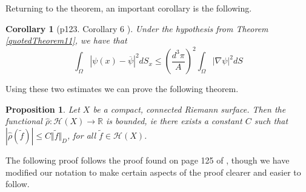 \documentclass[11pt]{report}
\newtheorem{prop}[thm]{Proposition}
\newtheorem{cor}[thm]{Corollary}
\theoremstyle{definition}
\begin{document}
Returning to the theorem, an important corollary is the following.
\begin{cor}[p123. Corollary 6 \cite{donaldson}]\label{quotedCorollary6}
  Under the hypothesis from Theorem \ref{quotedTheorem11}, we have that 
  \[\int_\Omega |\psi(x) - \overline{\psi}|^2 dS_x\leq \left(\frac{d^3\pi}{A}\right)^2\int_\Omega |\nabla\psi|^2 dS\]
\end{cor}
Using these two estimates we can prove the following theorem.
\begin{prop}
  Let $X$ be a compact, connected Riemann surface. Then the functional $\hat{\rho}:\mathcal{H}(X) \rightarrow \mathbb{R}$ is bounded, ie there exists a constant $C$ such that $|\hat{\rho}(\tilde{f})| \leq C \Vert \tilde{f} \Vert_D$, for all $\tilde{f} \in \mathcal{H}(X)$.
\end{prop}
The following proof follows the proof found on page 125 of \cite{donaldson}, though we have modified our notation to make certain aspects of the proof clearer and easier to follow.
\end{document}
